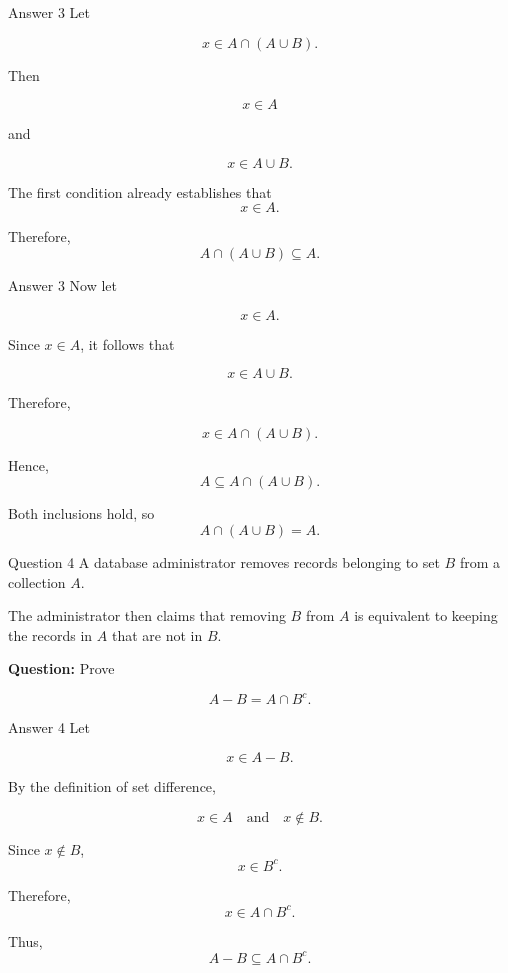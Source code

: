 \begin{frame}{Answer 3}
Let

$$
x\in A\cap(A\cup B).
$$

Then

$$
x\in A
$$

and

$$
x\in A\cup B.
$$

The first condition already establishes that
$$
x\in A.
$$

Therefore,
$$
A\cap(A\cup B)\subseteq A.
$$

\end{frame}

\begin{frame}{Answer 3}
Now let

$$
x\in A.
$$

Since $x\in A$, it follows that

$$
x\in A\cup B.
$$

Therefore,

$$
x\in A\cap(A\cup B).
$$

Hence,
$$
A\subseteq A\cap(A\cup B).
$$

Both inclusions hold, so
$$
\boxed{A\cap(A\cup B)=A}.
$$

\end{frame}


\begin{frame}{Question 4}
A database administrator removes records belonging to set $B$ from a collection $A$.

The administrator then claims that removing $B$ from $A$ is equivalent to keeping the records in $A$ that are not in $B$.

\textbf{Question:} Prove

$$
A-B=A\cap B^c.
$$

\end{frame}

\begin{frame}{Answer 4}
Let

$$
x\in A-B.
$$

By the definition of set difference,

$$
x\in A
\quad\text{and}\quad
x\notin B.
$$

Since $x\notin B$,
$$
x\in B^c.
$$

Therefore,
$$
x\in A\cap B^c.
$$

Thus,
$$
A-B\subseteq A\cap B^c.
$$

\end{frame}

